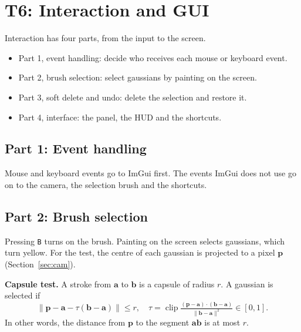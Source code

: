 \documentclass[9pt,twocolumn,a4paper]{extarticle}
\newcommand{\code}[1]{\texttt{#1}}
\begin{document}
\section{T6: Interaction and GUI}
\label{chap:t6}
Interaction has four parts, from the input to the screen.
\begin{itemize}\itemsep0pt
\item Part 1, event handling: decide who receives each mouse or keyboard event.
\item Part 2, brush selection: select gaussians by painting on the screen.
\item Part 3, soft delete and undo: delete the selection and restore it.
\item Part 4, interface: the panel, the HUD and the shortcuts.
\end{itemize}

\subsection{Part 1: Event handling}
Mouse and keyboard events go to ImGui first. The events ImGui does not use go on to the camera, the selection brush and the shortcuts.

\subsection{Part 2: Brush selection}
Pressing \code{B} turns on the brush. Painting on the screen selects gaussians, which turn yellow. For the test, the centre of each gaussian is projected to a pixel $\mathbf{p}$ (Section~\ref{sec:cam}).

\textbf{Capsule test.} A stroke from $\mathbf{a}$ to $\mathbf{b}$ is a capsule of radius $r$. A gaussian is selected if
\begin{equation}
\lVert\mathbf{p}-\mathbf{a}-\tau(\mathbf{b}-\mathbf{a})\rVert\le r,\quad \tau=\operatorname{clip}\tfrac{(\mathbf{p}-\mathbf{a})\cdot(\mathbf{b}-\mathbf{a})}{\lVert\mathbf{b}-\mathbf{a}\rVert^2}\in[0,1].
\label{eq:capsule}
\end{equation}
In other words, the distance from $\mathbf{p}$ to the segment $\mathbf{ab}$ is at most $r$.

\par\noindent{}\par\vspace{3pt}
 
\end{document}
